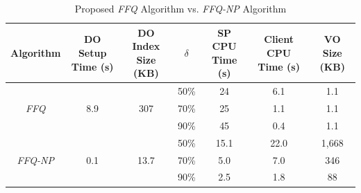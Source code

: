 \begin{table}[t]
  \centering
  \footnotesize
    \begin{tabular}{ccccccc}
      \toprule
      Algorithm &
      \tabincell{c}{DO Setup\\Time (s)} & \tabincell{c}{DO Index\\Size (KB)} &
      $\delta$ &
      \tabincell{c}{SP CPU\\Time (s)} & \tabincell{c}{Client CPU\\Time (s)} & \tabincell{c}{VO Size\\(KB)}   \\
      \midrule
      \multirow{3}{*}{\emph{FFQ}} &
      \multirow{3}{*}{8.9} &
      \multirow{3}{*}{307} &
      50\% &
      24 & 6.1 & 1.1 \\
         & & &
      70\% &
      25 & 1.1 & 1.1 \\
         & & &
      90\% &
      45 & 0.4 & 1.1 \\
      \midrule
      \multirow{3}{*}{\emph{FFQ-NP}} &
      \multirow{3}{*}{0.1} &
      \multirow{3}{*}{13.7} &
      50\% &
      15.1 & 22.0 & 1,668 \\
           & & &
      70\% &
      5.0 & 7.0 & 346 \\
          & & &
      90\% &
      2.5 & 1.8 & 88 \\
      \bottomrule
  \end{tabular}
  \caption{Proposed \emph{FFQ} Algorithm vs. \emph{FFQ-NP} Algorithm}\label{tab:aggregate-queries:baseline}
\end{table}

\newsavebox{\figbox}

